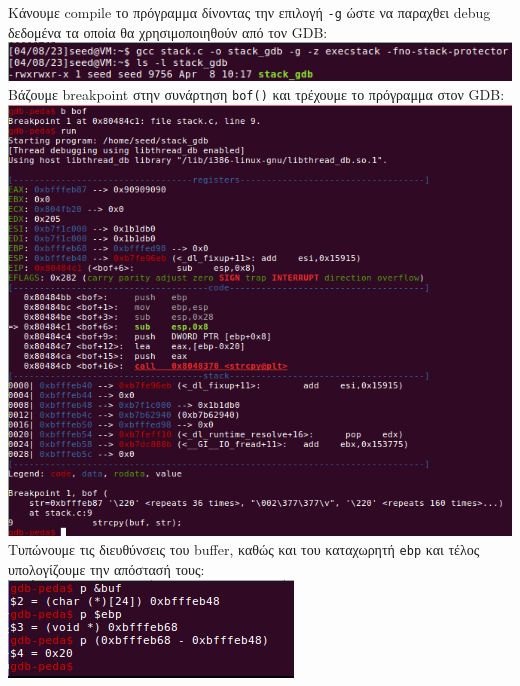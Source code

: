 \documentclass[12pt]{article}
\begin{document}
Κάνουμε compile το πρόγραμμα δίνοντας την επιλογή \lstinline{-g} ώστε να
παραχθει debug δεδομένα τα οποία θα χρησιμοποιηθούν από τον GDB: \\

\includegraphics[width=\textwidth]{res/stack_gdb.png} \\

Βάζουμε breakpoint στην συνάρτηση \lstinline{bof()} και τρέχουμε το πρόγραμμα στον
GDB: \\

\includegraphics[width=\textwidth]{res/gdb1.png} \\

Τυπώνουμε τις διευθύνσεις του buffer, καθώς και του καταχωρητή \lstinline{ebp}
και τέλος υπολογίζουμε την απόστασή τους: \\

\includegraphics[width=\textwidth]{res/gdb2.png} \\
\end{document}
